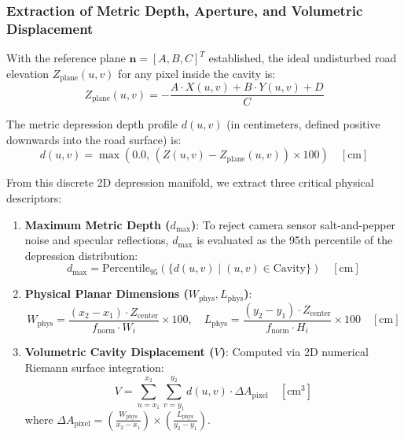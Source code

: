 \subsubsection{Extraction of Metric Depth, Aperture, and Volumetric Displacement}
With the reference plane $\mathbf{n} = [A, B, C]^T$ established, the ideal undisturbed road elevation $Z_{\text{plane}}(u, v)$ for any pixel inside the cavity is:
\begin{equation}
    Z_{\text{plane}}(u, v) = -\frac{A \cdot X(u, v) + B \cdot Y(u, v) + D}{C}
\end{equation}

The metric depression depth profile $d(u, v)$ (in centimeters, defined positive downwards into the road surface) is:
\begin{equation}
    d(u, v) = \max\left(0.0, \, \left( Z(u, v) - Z_{\text{plane}}(u, v) \right) \times 100 \right) \quad [\text{cm}]
    \label{eq:depression_profile}
\end{equation}

From this discrete 2D depression manifold, we extract three critical physical descriptors:
\begin{enumerate}
    \item \textbf{Maximum Metric Depth ($d_{\max}$)}:
    To reject camera sensor salt-and-pepper noise and specular reflections, $d_{\max}$ is evaluated as the 95th percentile of the depression distribution:
    \begin{equation}
        d_{\max} = \text{Percentile}_{95}\left( \{ d(u, v) \mid (u, v) \in \text{Cavity} \} \right) \quad [\text{cm}]
    \end{equation}
    
    \item \textbf{Physical Planar Dimensions ($W_{\text{phys}}, L_{\text{phys}}$)}:
    \begin{equation}
        W_{\text{phys}} = \frac{(x_2 - x_1) \cdot Z_{\text{center}}}{f_{\text{norm}} \cdot W_i} \times 100, \quad L_{\text{phys}} = \frac{(y_2 - y_1) \cdot Z_{\text{center}}}{f_{\text{norm}} \cdot H_i} \times 100 \quad [\text{cm}]
    \end{equation}
    
    \item \textbf{Volumetric Cavity Displacement ($V$)}:
    Computed via 2D numerical Riemann surface integration:
    \begin{equation}
        V = \sum_{u=x_1}^{x_2} \sum_{v=y_1}^{y_2} d(u, v) \cdot \Delta A_{\text{pixel}} \quad [\text{cm}^3]
    \end{equation}
    where $\Delta A_{\text{pixel}} = \left(\frac{W_{\text{phys}}}{x_2 - x_1}\right) \times \left(\frac{L_{\text{phys}}}{y_2 - y_1}\right)$.
\end{enumerate}

